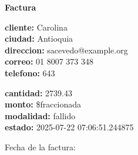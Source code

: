 \documentclass{article}
\begin{document}
\begin{center}
    {\LARGE \textbf{Factura}}\\[1cm]
\end{center}

\textbf{cliente:} Carolina \\
\textbf{ciudad:} Antioquia \\
\textbf{direccion:} sacevedo@example.org \\
\textbf{correo:} 01 8007 373 348 \\
\textbf{telefono:} 643 \\

\vspace{0.5cm}

\textbf{cantidad:} 2739.43 \\
\textbf{monto:} \$fraccionada \\
\textbf{modalidad:} fallido \\
\textbf{estado:} 2025-07-22 07:06:51.244875 \\

\vspace{1cm}

Fecha de la factura: 
\end{document}
